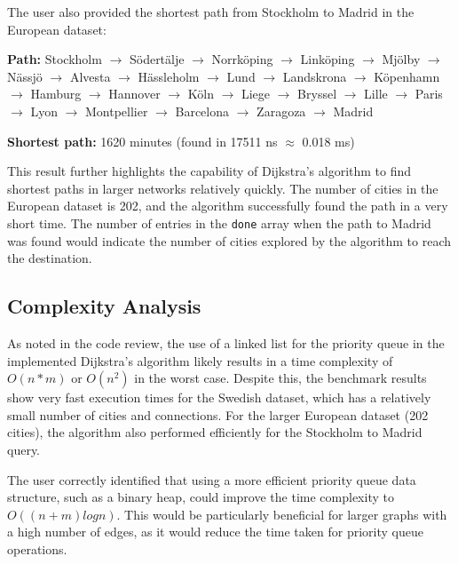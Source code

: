 \documentclass[a4paper,11pt]{article}
\begin{document}
The user also provided the shortest path from Stockholm to Madrid in the European dataset:

\textbf{Path:} Stockholm $\rightarrow$ Södertälje $\rightarrow$ Norrköping $\rightarrow$ Linköping $\rightarrow$ Mjölby $\rightarrow$ Nässjö $\rightarrow$ Alvesta $\rightarrow$ Hässleholm $\rightarrow$ Lund $\rightarrow$ Landskrona $\rightarrow$ Köpenhamn $\rightarrow$ Hamburg $\rightarrow$ Hannover $\rightarrow$ Köln $\rightarrow$ Liege $\rightarrow$ Bryssel $\rightarrow$ Lille $\rightarrow$ Paris $\rightarrow$ Lyon $\rightarrow$ Montpellier $\rightarrow$ Barcelona $\rightarrow$ Zaragoza $\rightarrow$ Madrid

\textbf{Shortest path:} 1620 minutes (found in 17511 ns $\approx$ 0.018 ms)

This result further highlights the capability of Dijkstra's algorithm to find shortest paths in larger networks relatively quickly. The number of cities in the European dataset is 202, and the algorithm successfully found the path in a very short time. The number of entries in the \texttt{done} array when the path to Madrid was found would indicate the number of cities explored by the algorithm to reach the destination.

\subsection*{Complexity Analysis}
As noted in the code review, the use of a linked list for the priority queue in the implemented Dijkstra's algorithm likely results in a time complexity of $O(n*m)$ or $O(n^2)$ in the worst case. Despite this, the benchmark results show very fast execution times for the Swedish dataset, which has a relatively small number of cities and connections. For the larger European dataset (202 cities), the algorithm also performed efficiently for the Stockholm to Madrid query.

The user correctly identified that using a more efficient priority queue data structure, such as a binary heap, could improve the time complexity to $O((n+m)log n)$. This would be particularly beneficial for larger graphs with a high number of edges, as it would reduce the time taken for priority queue operations.
\end{document}
